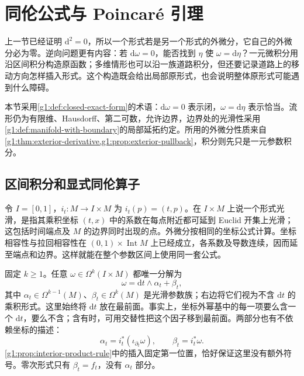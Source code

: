 
% 
% 

\section{同伦公式与 Poincaré 引理}
\label{g1:sec:1402}

上一节已经证明 \(\mathrm{d}^2=0\)，所以一个形式若是另一个形式的外微分，它自己的外微分必为零。逆向问题更有内容：若 \(\mathrm{d}\omega=0\)，能否找到 \(\eta\) 使 \(\omega=\mathrm{d}\eta\)？一元微积分用沿区间积分构造原函数；多维情形也可以沿一族道路积分，但还要记录道路上的移动方向怎样插入形式。这个构造既会给出局部原形式，也会说明整体原形式可能遇到什么障碍。

\ProseParagraphBreak

本节采用\cref{g1:def:closed-exact-form}的术语：\(\mathrm{d}\omega=0\) 表示闭，\(\omega=\mathrm{d}\eta\) 表示恰当。流形仍为有限维、Hausdorff、第二可数，允许边界，边界处的光滑性采用\cref{g1:def:manifold-with-boundary}的局部延拓约定。所用的外微分性质来自\cref{g1:thm:exterior-derivative,g1:prop:exterior-pullback}，积分则先只是一元参数积分。

\subsection{区间积分和显式同伦算子}
\label{g1:subsec:1402:01}

令 \(I=[0,1]\)，\(i_t:M\to I\times M\) 为 \(i_t(p)=(t,p)\)。在 \(I\times M\) 上说一个形式光滑，是指其乘积坐标 \((t,x)\) 中的系数在每点附近都可延到 Euclid 开集上光滑；这包括时间端点及 \(M\) 的边界同时出现的点。外微分按相同的坐标公式计算。坐标相容性与拉回相容性在 \((0,1)\times\operatorname{Int}M\) 上已经成立，各系数及导数连续，因而延至端点和边界。这样就能在整个参数区间上使用同一套公式。

\ProseParagraphBreak

固定 \(k\ge1\)。任意 \(\omega\in\Omega^k(I\times M)\) 都唯一分解为
\begin{equation}
	\label{g1:eq:interval-form-splitting}
	\omega=\mathrm{d}t\wedge\alpha_t+\beta_t,
\end{equation}
其中 \(\alpha_t\in\Omega^{k-1}(M)\)、\(\beta_t\in\Omega^k(M)\) 是光滑参数族；右边将它们视为不含 \(\mathrm{d}t\) 的乘积形式。这里始终将 \(\mathrm{d}t\) 放在最前面。事实上，坐标外幂基中的每一项要么含一个 \(\mathrm{d}t\)，要么不含；含有时，可用交替性把这个因子移到最前面。两部分也有不依赖坐标的描述：
\[
	\alpha_t=i_t^*(\iota_{\partial_t}\omega),\qquad
	\beta_t=i_t^*\omega.
\]
\cref{g1:prop:interior-product-rule}中的插入固定第一位置，恰好保证这里没有额外符号。零次形式只有 \(\beta_t=f_t\)，没有 \(\alpha_t\) 部分。

